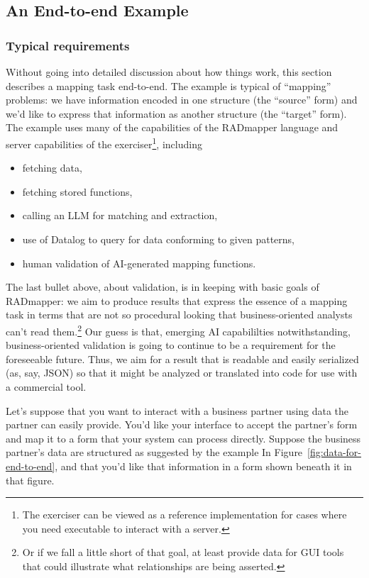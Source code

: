 \documentclass[10pt,letterpaper]{article} %
\begin{document}
\subsection{An End-to-end Example}

\subsubsection{Typical requirements}

Without going into detailed discussion about how things work, this section describes a mapping task end-to-end.
The example is typical of ``mapping'' problems: we have information encoded in one structure (the ``source'' form) and we'd like to express that information as another structure (the ``target'' form).
The example uses many of the capabilities of the RADmapper language and server capabilities of the exerciser\footnote{The exerciser can be viewed as a reference implementation for cases where you need executable to interact with a server.}, including
\begin{itemize}
  \item{fetching data,}
  \item{fetching stored functions,}
  \item{calling an LLM for matching and extraction,}
  \item{use of Datalog to query for data conforming to given patterns,}
  \item{human validation of AI-generated mapping functions.}
  \end{itemize}

The last bullet above, about validation, is in keeping with basic goals of RADmapper: we aim to produce results that express the essence of a mapping task in terms that are not so procedural looking that business-oriented analysts can't read them.\footnote{Or if we fall a little short of that goal, at least provide data for GUI tools that could illustrate what relationships are being asserted.}
Our guess is that, emerging AI capabililties notwithstanding, business-oriented validation is going to continue to be a requirement for the foreseeable future.
Thus, we aim for a result that is readable and easily serialized (as, say, JSON) so that it might be analyzed or translated into code for use with a commercial tool.

Let's suppose that you want to interact with a business partner using data the partner can easily provide.
You'd like your interface to accept the partner's form and map it to a form that your system can process directly.
Suppose the business partner's data are structured as suggested by the example In Figure~\ref{fig:data-for-end-to-end}, and that you'd like that information in a form shown beneath it in that figure.
\end{document}
